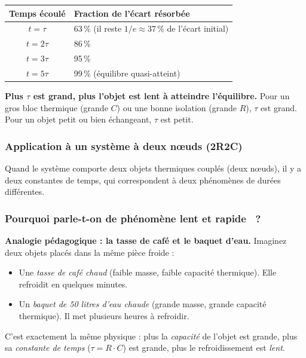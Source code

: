 \documentclass[11pt,a4paper]{article}
\begin{document}
\begin{center}
\begin{tabular}{cl}
\toprule
\textbf{Temps écoulé} & \textbf{Fraction de l'écart résorbée} \\
\midrule
$t = \tau$ & 63\,\% (il reste $1/e \approx 37\,\%$ de l'écart initial) \\
$t = 2\tau$ & 86\,\% \\
$t = 3\tau$ & 95\,\% \\
$t = 5\tau$ & 99\,\% (équilibre quasi-atteint) \\
\bottomrule
\end{tabular}
\end{center}

\textbf{Plus $\tau$ est grand, plus l'objet est lent à atteindre l'équilibre.} Pour un
gros bloc thermique (grande $C$) ou une bonne isolation (grande $R$), $\tau$ est grand.
Pour un objet petit ou bien échangeant, $\tau$ est petit.

\subsubsection*{Application à un système à deux nœuds (2R2C)}

Quand le système comporte deux objets thermiques couplés (deux nœuds), il y a deux
constantes de temps, qui correspondent à deux phénomènes de durées différentes.

\subsubsection*{Pourquoi parle-t-on de phénomène \og lent \fg{} et \og rapide \fg{}~?}

\textbf{Analogie pédagogique : la tasse de café et le baquet d'eau.}
Imaginez deux objets placés dans la même pièce froide :

\begin{itemize}[itemsep=2pt]
\item Une \emph{tasse de café chaud} (faible masse, faible capacité thermique). Elle
refroidit en quelques minutes.
\item Un \emph{baquet de 50 litres d'eau chaude} (grande masse, grande capacité thermique).
Il met plusieurs heures à refroidir.
\end{itemize}

C'est exactement la même physique : plus la \emph{capacité} de l'objet est grande, plus
sa \emph{constante de temps} ($\tau = R \cdot C$) est grande, plus le refroidissement est
\emph{lent}.
\end{document}
